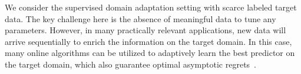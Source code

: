 \documentclass{article}
\begin{document}
    We consider the supervised domain adaptation setting with scarce labeled target data. The key challenge here is the absence of meaningful data to tune any parameters. However, in many practically relevant applications, new data will arrive sequentially to enrich the information on the target domain. In this case, many online algorithms can be utilized to adaptively learn the best predictor on the target domain, which also guarantee optimal asymptotic regrets~\cite{ref:lattimore2020bandit}. 
    
   
\end{document}
